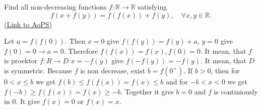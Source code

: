 \begin{problem}
	Find all non-decreasing functions $f: \mathbb R \to \mathbb R$ satisfying \[ f(x+f(y))=f(f(x))+f(y),\quad \forall x,y \in \mathbb R.\]
	\flushright \href{https://artofproblemsolving.com/community/c6h309564}{(Link to AoPS)}
\end{problem}



\begin{solution}
	Let $ a=f(f(0))$. Then $ x=0$ give $ f(f(y))=f(y)+a$, $ y=0$ give $ f(0)=0\to a=0$. Therefore $ f(f(x))=f(x),f(0)=0$. It mean, that $ f$ is proektor $ f: R\to D$
$ x=-f(y)$ give $ f(-f(y))=-f(y)$. It mean, that $ D$ is symmetric.
Because $ f$ is non decrease, exist $ b=f(0^+)$. If $ b>0$, then for $ 0<x\le b$ we get $ f(b)\le f(f(x))=f(x)\le b$
and for $ -b<x<0$ we get $ f(-b)\ge f(f(x))=f(x)\ge -b$. Together it give $ b=0$ and $ f$ is continiously in 0.
It give $ f(x)=0$ or $ f(x)=x$.
\end{solution}



